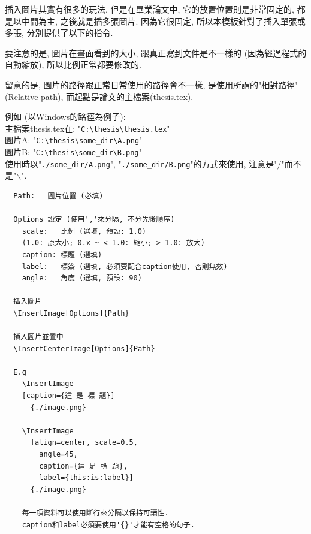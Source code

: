 

插入圖片其實有很多的玩法, 但是在畢業論文中, 它的放置位置則是非常固定的, 都是以中間為主, 之後就是插多張圖片. 因為它很固定, 所以本模板針對了插入單張或多張, 分別提供了以下的指令.

要注意的是, 圖片在畫面看到的大小, 跟真正寫到文件是不一樣的 (因為經過程式的自動縮放), 所以比例正常都要修改的.

留意的是, 圖片的路徑跟正常日常使用的路徑會不一樣, 是使用所謂的"相對路徑" (Relative path), 而起點是論文的主檔案(thesis.tex).

\noindent 例如 (以Windows的路徑為例子):\\
主檔案thesis.tex在: "\verb|C:\thesis\thesis.tex|"\\
圖片A: "\verb|C:\thesis\some_dir\A.png|"\\
圖片B: "\verb|C:\thesis\some_dir\B.png|"\\
使用時以"\verb|./some_dir/A.png|", "\verb|./some_dir/B.png|"的方式來使用, 注意是"$/$"而不是"$\backslash$".

\newpage
{}

  \begin{framed}
  \begin{verbatim}
  Path:   圖片位置 (必填)

  Options 設定 (使用','來分隔, 不分先後順序)
    scale:   比例 (選填, 預設: 1.0)
    (1.0: 原大小; 0.x ~ < 1.0: 縮小; > 1.0: 放大)
    caption: 標題 (選填)
    label:   標簽 (選填, 必須要配合caption使用, 否則無效)
    angle:   角度 (選填, 預設: 90)

  插入圖片
  \InsertImage[Options]{Path}

  插入圖片並置中
  \InsertCenterImage[Options]{Path}

  E.g
    \InsertImage
    [caption={這 是 標 題}]
      {./image.png}

    \InsertImage
      [align=center, scale=0.5,
        angle=45,
        caption={這 是 標 題},
        label={this:is:label}]
      {./image.png}

    每一項資料可以使用斷行來分隔以保持可讀性.
    caption和label必須要使用'{}'才能有空格的句子.
  \end{verbatim}
  \end{framed}

